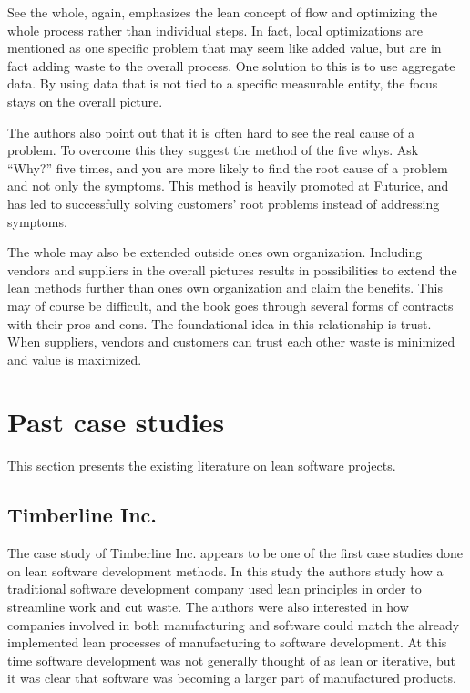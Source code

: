 See the whole, again, emphasizes the lean concept of flow and optimizing the whole process rather than individual steps. In fact, local optimizations are mentioned as one specific problem that may seem like added value, but are in fact adding waste to the overall process. One solution to this is to use aggregate data. By using data that is not tied to a specific measurable entity, the focus stays on the overall picture.\cite{poppendieck2003lean}

The authors also point out that it is often hard to see the real cause of a problem. To overcome this they suggest the method of the five whys. Ask ``Why?'' five times, and you are more likely to find the root cause of a problem and not only the symptoms.\cite{poppendieck2003lean} This method is heavily promoted at Futurice, and has led to successfully solving customers' root problems instead of addressing symptoms.

The whole may also be extended outside ones own organization. Including vendors and suppliers in the overall pictures results in possibilities to extend the lean methods further than ones own organization and claim the benefits. This may of course be difficult, and the book goes through several forms of contracts with their pros and cons. The foundational idea in this relationship is trust. When suppliers, vendors and customers can trust each other waste is minimized and value is maximized.\cite{poppendieck2003lean}


\section{Past case studies}
\label{section:pastleanprojects}

This section presents the existing literature on lean software projects.\\


\subsection{Timberline Inc.}
\label{timberline}

The case study of Timberline Inc. appears to be one of the first case studies done on lean software development methods. In this study the authors study how a traditional software development company used lean principles in order to streamline work and cut waste. The authors were also interested in how companies involved in both manufacturing and software could match the already implemented lean processes of manufacturing to software development. At this time software development was not generally thought of as lean or iterative, but it was clear that software was becoming a larger part of manufactured products.\cite{Middleton2005Lean}

